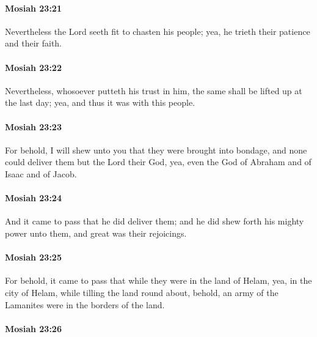 		\paragraph{Mosiah 23:21} %
			\label{MOSIAH-23-21}

			Nevertheless the Lord seeth fit to chasten his people;
			yea, he trieth their patience and their faith.

		\paragraph{Mosiah 23:22} %
			\label{MOSIAH-23-22}

			Nevertheless, whosoever putteth his trust in him,
			the same shall be lifted up at the last day;
			yea, and thus it was with this people.

		\paragraph{Mosiah 23:23} %
			\label{MOSIAH-23-23}

			For behold, I will shew unto you
			that they were brought into bondage,
			and none could deliver them but the Lord their God,
			yea, even the God of Abraham and of Isaac and of Jacob.

		\paragraph{Mosiah 23:24} %
			\label{MOSIAH-23-24}

			And it came to pass that he did deliver them;
			and he did shew forth his mighty power unto them,
			and great was their rejoicings.

		\paragraph{Mosiah 23:25} %
			\label{MOSIAH-23-25}

			For behold, it came to pass that
			while they were in the land of Helam,
			yea, in the city of Helam,
			while tilling the land round about,
			behold, an army of the Lamanites were in the borders of the land.

		\paragraph{Mosiah 23:26} %
			\label{MOSIAH-23-26}

